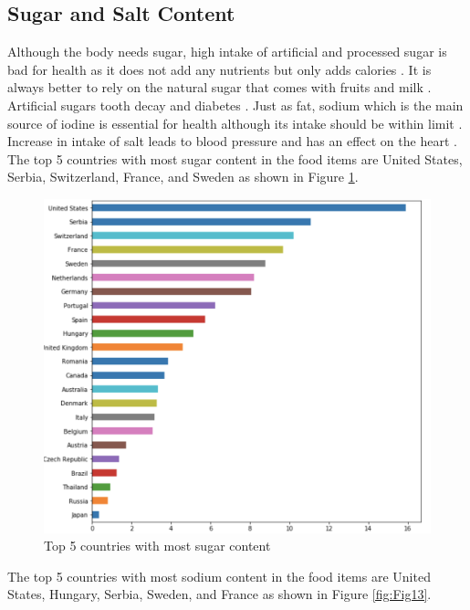 \documentclass[sigconf]{acmart}
\begin{document}
\subsection{Sugar and Salt Content}
Although the body needs sugar, high intake of artificial and processed sugar is bad for health as it does not add any nutrients but only adds calories \cite{www-sugar}. It is always better to rely on the natural sugar that comes with fruits and milk \cite{www-sugar}. Artificial sugars tooth decay and diabetes \cite{www-sugar}. Just as fat, sodium which is the main source of iodine is essential for health although its intake should be within limit \cite{www-sugar}. Increase in intake of salt leads to blood pressure and has an effect on the heart \cite{www-sugar}. \\

The top 5 countries with most sugar content in the food items are United States, Serbia, Switzerland, France, and Sweden as shown in Figure \ref{fig:Fig12}. \\
	
\begin{figure}
\includegraphics[width=1.0\columnwidth]{images/fig12.png}
\caption{Top 5 countries with most sugar content \cite{code-base}}
\label{fig:Fig12}
\end{figure} 

The top 5 countries with most sodium content in the food items are United States, Hungary, Serbia, Sweden, and France as shown in Figure \ref{fig:Fig13}. \\
	
\end{document}
